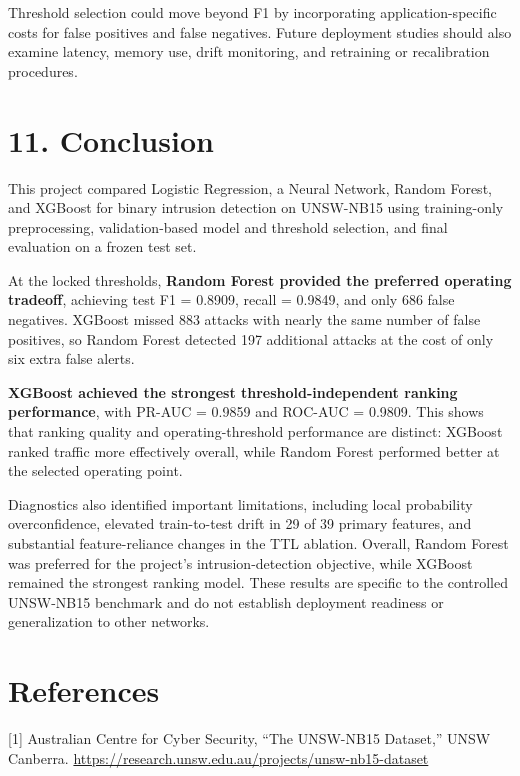 \documentclass[
  canadian,
  12pt,
]{article}
\let\reportOrigSection\section
\renewcommand{\section}{\par\Needspace*{10\baselineskip}\reportOrigSection}%
\begin{document}
Threshold selection could move beyond F1 by incorporating
application-specific costs for false positives and false negatives.
Future deployment studies should also examine latency, memory use, drift
monitoring, and retraining or recalibration procedures.

\section[\texorpdfstring{\numberline{11.}Conclusion}{11. Conclusion}]{11. Conclusion}\label{sec-11}

This project compared Logistic Regression, a Neural Network, Random
Forest, and XGBoost for binary intrusion detection on UNSW-NB15 using
training-only preprocessing, validation-based model and threshold
selection, and final evaluation on a frozen test set.

At the locked thresholds, \textbf{Random Forest provided the preferred
operating tradeoff}, achieving test F1 = 0.8909, recall = 0.9849, and
only 686 false negatives. XGBoost missed 883 attacks with nearly the
same number of false positives, so Random Forest detected 197 additional
attacks at the cost of only six extra false alerts.

\textbf{XGBoost achieved the strongest threshold-independent ranking
performance}, with PR-AUC = 0.9859 and ROC-AUC = 0.9809. This shows that
ranking quality and operating-threshold performance are distinct:
XGBoost ranked traffic more effectively overall, while Random Forest
performed better at the selected operating point.

Diagnostics also identified important limitations, including local
probability overconfidence, elevated train-to-test drift in 29 of 39
primary features, and substantial feature-reliance changes in the TTL
ablation. Overall, Random Forest was preferred for the project's
intrusion-detection objective, while XGBoost remained the strongest
ranking model. These results are specific to the controlled UNSW-NB15
benchmark and do not establish deployment readiness or generalization to
other networks.

\clearpage

\section{References}\label{sec-refs}

{[}1{]} Australian Centre for Cyber Security, ``The UNSW-NB15 Dataset,''
UNSW Canberra.
\url{https://research.unsw.edu.au/projects/unsw-nb15-dataset}
\end{document}
